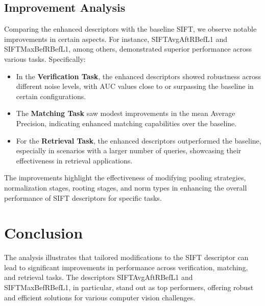 \subsection*{Improvement Analysis}

Comparing the enhanced descriptors with the baseline SIFT, we observe notable improvements in certain aspects. For instance, SIFTAvgAftRBefL1 and SIFTMaxBefRBefL1, among others, demonstrated superior performance across various tasks. Specifically:

\begin{itemize}
    \item In the \textbf{Verification Task}, the enhanced descriptors showed robustness across different noise levels, with AUC values close to or surpassing the baseline in certain configurations.
    \item The \textbf{Matching Task} saw modest improvements in the mean Average Precision, indicating enhanced matching capabilities over the baseline.
    \item For the \textbf{Retrieval Task}, the enhanced descriptors outperformed the baseline, especially in scenarios with a larger number of queries, showcasing their effectiveness in retrieval applications.
\end{itemize}

The improvements highlight the effectiveness of modifying pooling strategies, normalization stages, rooting stages, and norm types in enhancing the overall performance of SIFT descriptors for specific tasks.

\section*{Conclusion}

The analysis illustrates that tailored modifications to the SIFT descriptor can lead to significant improvements in performance across verification, matching, and retrieval tasks. The descriptors SIFTAvgAftRBefL1 and SIFTMaxBefRBefL1, in particular, stand out as top performers, offering robust and efficient solutions for various computer vision challenges.



